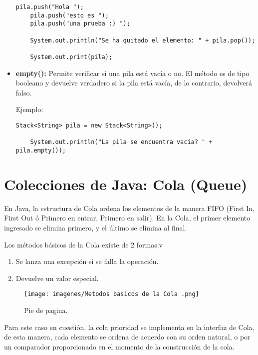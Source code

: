 \documentclass[12pt, letterpaper]{article} %
\begin{document}
\begin{itemize}
\begin{lstlisting}[frame=single]
    pila.push("Hola ");
    pila.push("esto es ");
    pila.push("una prueba :) ");

    System.out.println("Se ha quitado el elemento: " + pila.pop());

    System.out.print(pila);
    \end{lstlisting}

    \item \textbf{empty():} Permite verificar si una pila está vacía o no. El método es de tipo booleano y devuelve verdadero si la pila está vacía, de lo contrario, devolverá falso.

    Ejemplo:
    \lstset{language = Java, breaklines=true, basicstyle=\footnotesize}
    \begin{lstlisting}[frame=single]
    Stack<String> pila = new Stack<String>();

    System.out.println("La pila se encuentra vacia? " + pila.empty());
    \end{lstlisting}
\end{itemize}

\section{Colecciones de Java: Cola (Queue)}
En Java, la estructura de Cola ordena los elementos de la manera FIFO (First In, First Out ó Primero en entrar, Primero en salir). En la Cola, el primer elemento ingresado se elimina primero, y el último se elimina al final.

Los métodos básicos de la Cola existe de 2 formas:v
\begin{enumerate}
    \item Se lanza una excepción si se falla la operación.
    \item Devuelve un valor especial.
\end{enumerate}
\begin{figure}[h]
    \centering
    \texttt{[image: imagenes/Metodos basicos de la Cola .png]}
    \caption{Pie de pagina.}
    \label{fig:tabla}
\end{figure}
Para este caso en cuestión, la cola prioridad se implementa en la interfaz de Cola, de esta manera, cada elemento se ordena de acuerdo con su orden natural, o por un comparador proporcionado en el momento de la construcción de la cola.
\end{document}
